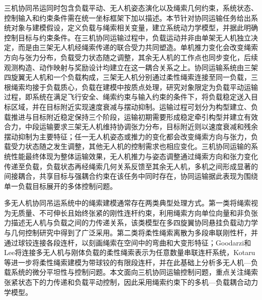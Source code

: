 三机协同吊运同时包含负载平动、无人机姿态演化以及绳索几何约束，系统状态、控制输入和约束条件需在统一坐标框架下加以描述。本节针对协同运输任务给出系统对象与建模假设，定义负载与绳索相关变量，建立系统动力学模型，并据此明确控制目标与约束条件。在三机协同运输过程中，负载运动并非由单架无人机独立决定，而是由三架无人机经绳索传递的联合受力共同塑造。单机推力变化会改变绳索方向与张力分布，负载受力状态随之调整，其余无人机的工作点也同步变化，后续观测构造、动作映射与奖励设计均建立在这一耦合关系之上。协同运输系统由三架四旋翼无人机和一个负载构成，三架无人机分别通过柔性绳索连接至同一负载，三根绳索均接于负载质心，负载在建模中按质点处理，研究对象限定为负载平动运输过程，即系统在满足飞行安全、绳索约束与输入约束的条件下，将负载稳定送入目标区域，并在目标附近实现速度衰减与摆动抑制。运输过程可划分为构型建立、负载推进与目标附近稳定保持三个阶段，运输初期需要形成稳定牵引构型并建立有效合力，中段运输要求三架无人机维持协调张力分布，目标附近则以速度衰减和残余摆动抑制为主要特征；任一无人机姿态或推力的变化都会改变绳索方向与张力，负载受力状态随之发生调整，其他无人机的控制需求也相应变化。三机协同运输的系统性能最终体现为整体运输效果，无人机推力与姿态调整通过绳索方向和张力变化传递至负载，负载状态再经绳索几何关系反馈至其余无人机，多机之间形成显著的间接耦合，共享目标与强耦合约束在该任务中同时存在，协同运输据此表现为围绕单一负载目标展开的多体控制问题。

多无人机协同吊运系统中的绳索建模通常存在两类典型处理方式。第一类将绳索视为无质量、不可伸长且始终张紧的刚性连杆约束，利用绳索方向单位向量和非负张力描述无人机与负载之间的力传递关系，该类模型在多四旋翼协同悬挂负载动力学与几何控制研究中得到了广泛采用\cite{sreenath2013dynamics,lee2013geometricCooperating}。第二类将柔性绳索离散为多段串联刚性杆，并通过球铰连接各段连杆，以刻画绳索在空间中的弯曲和大变形特征；Goodarzi和Lee将连接多无人机与刚体负载的柔性绳索表示为任意数量串联连杆系统\cite{goodarzi2015dynamicsFlexibleCables}，Kotaru等进一步将柔性绳索建模为带球铰的有限段连杆，并在此基础上分析多无人机—负载系统的微分平坦性与控制问题\cite{kotaru2018differentialFlatnessFlexibleCables}。本文面向三机协同运输控制问题，重点关注绳索张紧状态下的力传递和负载平动控制，因此采用绳索约束下的多机—负载耦合动力学模型。

